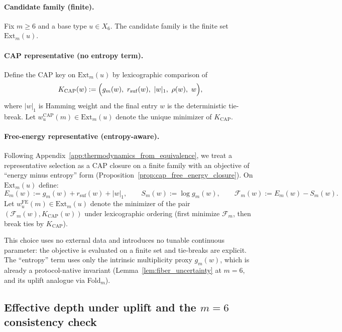 \paragraph{Candidate family (finite).}
Fix $m\ge 6$ and a base type $u\in X_6$.
The candidate family is the finite set $\mathrm{Ext}_m(u)$.

\paragraph{CAP representative (no entropy term).}
Define the CAP key on $\mathrm{Ext}_m(u)$ by lexicographic comparison of
\[
K_{\mathrm{CAP}}(w)
:=\Bigl(g_m(w),\ r_{\mathrm{suf}}(w),\ |w|_1,\ \rho(w),\ w\Bigr),
\]
where $|w|_1$ is Hamming weight and the final entry $w$ is the deterministic tie-break.
Let $w^{\mathrm{CAP}}_{u}(m)\in \mathrm{Ext}_m(u)$ denote the unique minimizer of $K_{\mathrm{CAP}}$.

\paragraph{Free-energy representative (entropy-aware).}
Following Appendix~\ref{app:thermodynamics_from_equivalence},
we treat a representative selection as a CAP closure on a finite family with an objective of
``energy minus entropy'' form (Proposition~\ref{prop:cap_free_energy_closure}).
On $\mathrm{Ext}_m(u)$ define:
\[
E_m(w):=g_m(w)+r_{\mathrm{suf}}(w)+|w|_1,
\qquad
S_m(w):=\log g_m(w),
\qquad
\mathcal{F}_m(w):=E_m(w)-S_m(w).
\]
Let $w^{\mathrm{FE}}_{u}(m)\in \mathrm{Ext}_m(u)$ denote the minimizer of
the pair $(\mathcal{F}_m(w),K_{\mathrm{CAP}}(w))$ under lexicographic ordering
(first minimize $\mathcal{F}_m$, then break ties by $K_{\mathrm{CAP}}$).
\begin{remark}\label{rem:free_energy_audit_note}
This choice uses no external data and introduces no tunable continuous parameter:
the objective is evaluated on a finite set and tie-breaks are explicit.
The ``entropy'' term uses only the intrinsic multiplicity proxy $g_m(w)$,
which is already a protocol-native invariant (Lemma~\ref{lem:fiber_uncertainty} at $m=6$,
and its uplift analogue via Fold$_m$).
\end{remark}

\subsection{Effective depth under uplift and the \texorpdfstring{$m=6$}{m=6} consistency check}
\label{subsec:mass_flow_effective_depth}

